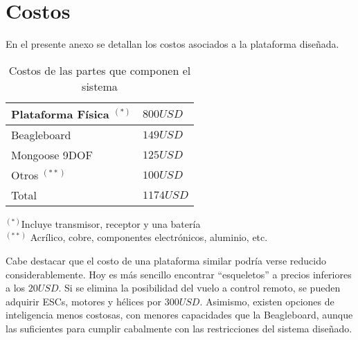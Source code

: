 \documentclass[main]{subfiles}
\begin{document}
\chapter{Costos}
\label{chap:anexo_costos}
En el presente anexo se detallan los costos asociados a la plataforma diseñada.

\begin{table}[H]
\begin{center}
\begin{tabular}{|p{5cm}|p{3cm}|}
\hline
Plataforma F\'isica $^{(*)}$  & $800USD $ \\
\hline
Beagleboard & $149USD$ \\
\hline
Mongoose 9DOF & $125USD$\\
\hline
Otros $^{(**)}$ & $100USD$\\
\hline
Total & $1174USD$ \\
\hline
\end{tabular}
\label{tab:acc-anexo}
\end{center}
\begin{center}
$^{(*)}$Incluye transmisor, receptor y una bater\'ia\\
$^{(**)}$ Acr\'ilico, cobre, componentes electr\'onicos, aluminio, etc.
\end{center}
\caption{Costos de las partes que componen el sistema}
\end{table}

Cabe destacar que el costo de una plataforma similar podr\'ia verse reducido considerablemente. Hoy es m\'as sencillo encontrar ``esqueletos'' a precios inferiores a los $20USD$. Si se elimina la posibilidad del vuelo a control remoto, se pueden adquirir ESCs, motores y h\'elices por $300 USD$. Asimismo, existen opciones de inteligencia menos costosas, con menores capacidades que la Beagleboard, aunque las suficientes para cumplir cabalmente con las restricciones del sistema diseñado. 
\end{document}
